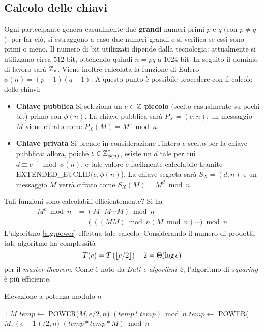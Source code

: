 \subsection{Calcolo delle chiavi}
Ogni partecipante genera casualmente due \textbf{grandi} numeri primi $p$ e $q$ (con $p\neq q$): per far ciò, si estraggono a caso due numeri grandi e si verifica se essi sono primi o meno. Il numero di bit utilizzati dipende dalla tecnologia: attualmente si utilizzano circa $512$ bit, ottenendo quindi $n=pq$ a $1024$ bit. In seguito il dominio di lavoro sarà $\operatorname*{\mathbb{Z}_n}$. Viene inoltre calcolata la funzione di Eulero $\phi(n)=(p-1)(q-1)$. A questo punto è possibile procedere con il calcolo delle chiavi:
\begin{itemize}
\item \textbf{Chiave pubblica} Si seleziona un $e\in\operatorname*{\mathbb{Z}}$ \textbf{piccolo} (scelto casualmente su pochi bit) primo con $\phi(n)$. La chiave pubblica sarà $P_X=(e,n)$: un messaggio $M$ viene cifrato come $P_X(M)=M^e\bmod n$;
\item \textbf{Chiave privata} Si prende in considerazione l'intero $e$ scelto per la chiave pubblica: allora, poiché $e\in\operatorname*{\mathbb{Z}}_{\phi(n)}^*$, esiste un $d$ tale per cui $d \equiv e^{-1}\bmod\phi(n)$, e tale valore è facilmente calcolabile tramite EXTENDED\_EUCLID($e,\phi(n)$). La chiave segreta sarà $S_X=(d,n)$ e un messaggio $M$ verrà cifrato come $S_X(M)=M^d\bmod n$.
\end{itemize}

Tali funzioni sono calcolabili efficientemente? Si ha
\begin{align*}
M^e\bmod n &= (M\cdot M\cdots M)\bmod n \\
&=(((MM)\bmod n) M\bmod n)\cdots )\bmod n
\end{align*}
L'algoritmo \ref{alg:power} effettua tale calcolo. Considerando il numero di prodotti, tale algoritmo ha complessità
\[
T(e)=T\left(\lfloor e/2\rfloor\right) + 2 = \Theta(\log e)
\]
per il \textit{master theorem}. Come è noto da \textit{Dati e algoritmi 2}, l'algoritmo di \textit{squaring} è più efficiente.

\begin{algorithm}
\caption{Elevazione a potenza modulo $n$}
\label{alg:power}
\begin{algorithmic}
		\State \Return $1$
	\EndIf
		\State \Return $M$
	\EndIf
		\State $temp\gets$ POWER($M,e/2,n$)
		\State \Return $(temp * temp)\bmod n$
	\Else
		\State $temp\gets$ POWER($M,(e-1)/2,n$)
		\State \Return $(temp * temp * M)\bmod n$
	\EndIf
\EndFunction
\end{algorithmic}
\end{algorithm}

